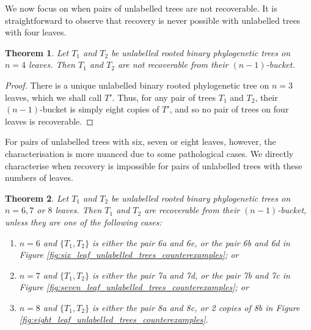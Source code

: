 \documentclass[12pt]{article}
\newtheorem{Theorem}{Theorem}[section]
\theoremstyle{definition}
\begin{document}
We now focus on when pairs of unlabelled trees are not recoverable. It is straightforward to observe that recovery is never possible with unlabelled trees with four leaves.

\begin{Theorem}
    Let $T_1$ and $T_2$ be unlabelled rooted binary phylogenetic trees on $n=4$ leaves. Then $T_1$ and $T_2$ are not recoverable from their $(n-1)$-bucket.
\end{Theorem}

\begin{proof}
    There is a unique unlabelled binary rooted phylogenetic tree on $n=3$ leaves, which we shall call $T'$. Thus, for any pair of trees $T_1$ and $T_2$, their $(n-1)$-bucket is simply eight copies of $T'$, and so no pair of trees on four leaves is recoverable. 
\end{proof}

For pairs of unlabelled trees with six, seven or eight leaves, however, the characterisation is more nuanced due to some pathological cases. We directly characterise when recovery is impossible for pairs of unlabelled trees with these numbers of leaves.

\begin{Theorem}\label{unlabelled_buckets_large_counterexamples}
    Let $T_1$ and $T_2$ be unlabelled rooted binary phylogenetic trees on $n=6,7$ or $8$ leaves. Then $T_1$ and $T_2$ are recoverable from their $(n-1)$-bucket, unless they are one of the following cases:

    \begin{enumerate}
        \item $n=6$ and $\{T_1,T_2\}$ is either the pair 6a and 6e, or the pair 6b and 6d in Figure \ref{fig:six_leaf_unlabelled_trees_counterexamples}; or
        \item $n=7$ and $\{T_1,T_2\}$ is either the pair 7a and 7d, or the pair 7b and 7c in Figure \ref{fig:seven_leaf_unlabelled_trees_counterexamples}; or
        \item $n=8$ and $\{T_1,T_2\}$ is either the pair 8a and 8c, or 2 copies of 8b in Figure \ref{fig:eight_leaf_unlabelled_trees_counterexamples}.
    \end{enumerate}
\end{Theorem}
\end{document}
